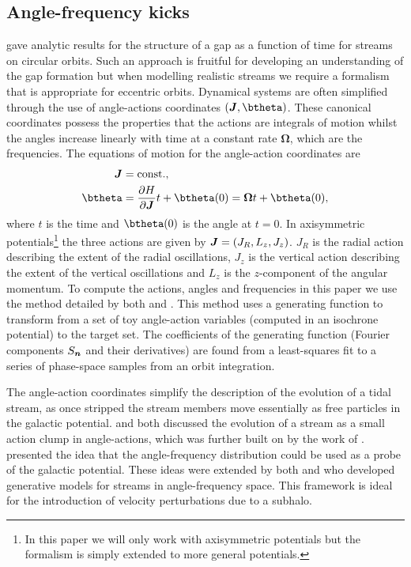 \documentclass[useAMS,usenatbib,fleqn,a4paper]{mn2e}
\newcommand{\bs}[1]{\bmath{#1}}
\begin{document}
\subsection{Angle-frequency kicks}\label{Sec::Formalism_angfreq}
\cite{ErkalBelokurov2015} gave analytic results for the structure of a gap as a function of time for streams on circular orbits. Such an approach is fruitful for developing an understanding of the gap formation but when modelling realistic streams we require a formalism that is appropriate for eccentric orbits. Dynamical systems are often simplified through the use of angle-actions coordinates $(\bs{J},\btheta)$. These canonical coordinates possess the properties that the actions are integrals of motion whilst the angles increase linearly with time at a constant rate $\boldsymbol{\Omega}$, which are the frequencies. The equations of motion for the angle-action coordinates are
\begin{equation}
\begin{split}
\bs{J}&=\mathrm{const.},\\
\btheta&=\frac{\partial H}{\partial\boldsymbol{J}}t+\btheta(0)=\boldsymbol{\Omega}t+\btheta(0),
\end{split}
\end{equation}
where $t$ is the time and $\btheta(0)$ is the angle at $t=0$. In axisymmetric potentials\footnote{In this paper we will only work with axisymmetric potentials but the formalism is simply extended to more general potentials.} the three actions are given by $\bs{J}=(J_R,L_z,J_z)$. $J_R$ is the radial action describing the extent of the radial oscillations, $J_z$ is the vertical action describing the extent of the vertical oscillations and $L_z$ is the $z$-component of the angular momentum. To compute the actions, angles and frequencies in this paper we use the method detailed by both \cite{SandersBinney2014} and \cite{Bovy2014}. This method uses a generating function to transform from a set of toy angle-action variables (computed in an isochrone potential) to the target set. The coefficients of the generating function (Fourier components $S_{\bs{n}}$ and their derivatives) are found from a least-squares fit to a series of phase-space samples from an orbit integration.

The angle-action coordinates simplify the description of the evolution of a tidal stream, as once stripped the stream members move essentially as free particles in the galactic potential. \cite{HelmiWhite1999} and \cite{Tremaine1999} both discussed the evolution of a stream as a small action clump in angle-actions, which was further built on by the work of \cite{EyreBinney2011}. \cite{SandersBinney2013b} presented the idea that the angle-frequency distribution could be used as a probe of the galactic potential. These ideas were extended by both \cite{Bovy2014} and \cite{Sanders2014} who developed generative models for streams in angle-frequency space. This framework is ideal for the introduction of velocity perturbations due to a subhalo.
\end{document}
